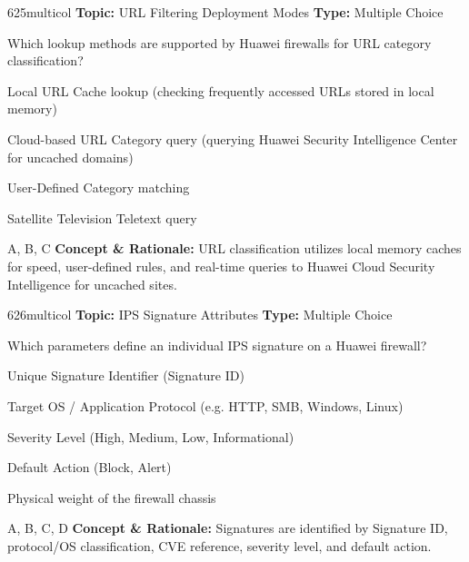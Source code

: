 \begin{qcard}{625}{multicol}
\textcolor{darkslate!75}{\small\textbf{Topic:} URL Filtering Deployment Modes \hfill \textbf{Type:} Multiple Choice}\vspace{0.4em}\par
Which lookup methods are supported by Huawei firewalls for URL category classification?
\begin{qoptions}
\item Local URL Cache lookup (checking frequently accessed URLs stored in local memory)
\item Cloud-based URL Category query (querying Huawei Security Intelligence Center for uncached domains)
\item User-Defined Category matching
\item Satellite Television Teletext query
\end{qoptions}
\end{qcard}
\nopagebreak
\begin{explainbox}{A, B, C}
\textbf{Concept \& Rationale:} URL classification utilizes local memory caches for speed, user-defined rules, and real-time queries to Huawei Cloud Security Intelligence for uncached sites.
\end{explainbox}

\begin{qcard}{626}{multicol}
\textcolor{darkslate!75}{\small\textbf{Topic:} IPS Signature Attributes \hfill \textbf{Type:} Multiple Choice}\vspace{0.4em}\par
Which parameters define an individual IPS signature on a Huawei firewall?
\begin{qoptions}
\item Unique Signature Identifier (Signature ID)
\item Target OS / Application Protocol (e.g. HTTP, SMB, Windows, Linux)
\item Severity Level (High, Medium, Low, Informational)
\item Default Action (Block, Alert)
\item Physical weight of the firewall chassis
\end{qoptions}
\end{qcard}
\nopagebreak
\begin{explainbox}{A, B, C, D}
\textbf{Concept \& Rationale:} Signatures are identified by Signature ID, protocol/OS classification, CVE reference, severity level, and default action.
\end{explainbox}

